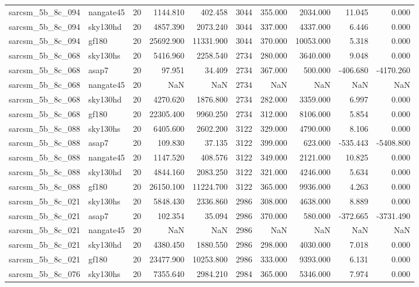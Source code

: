 \documentclass{article}
\begin{document}
\begin{longtable}{llrrrrrrrr}
sarcsm\_5b\_8c\_094 & nangate45 & 20 & 1144.810 & 402.458 & 3044 & 355.000 & 2034.000 & 11.045 & 0.000 \\
sarcsm\_5b\_8c\_094 & sky130hd & 20 & 4857.390 & 2073.240 & 3044 & 337.000 & 4337.000 & 6.446 & 0.000 \\
sarcsm\_5b\_8c\_094 & gf180 & 20 & 25692.900 & 11331.900 & 3044 & 370.000 & 10053.000 & 5.318 & 0.000 \\
sarcsm\_5b\_8c\_068 & sky130hs & 20 & 5416.960 & 2258.540 & 2734 & 280.000 & 3640.000 & 9.048 & 0.000 \\
sarcsm\_5b\_8c\_068 & asap7 & 20 & 97.951 & 34.409 & 2734 & 367.000 & 500.000 & -406.680 & -4170.260 \\
sarcsm\_5b\_8c\_068 & nangate45 & 20 & NaN & NaN & 2734 & NaN & NaN & NaN & NaN \\
sarcsm\_5b\_8c\_068 & sky130hd & 20 & 4270.620 & 1876.800 & 2734 & 282.000 & 3359.000 & 6.997 & 0.000 \\
sarcsm\_5b\_8c\_068 & gf180 & 20 & 22305.400 & 9960.250 & 2734 & 312.000 & 8106.000 & 5.854 & 0.000 \\
sarcsm\_5b\_8c\_088 & sky130hs & 20 & 6405.600 & 2602.200 & 3122 & 329.000 & 4790.000 & 8.106 & 0.000 \\
sarcsm\_5b\_8c\_088 & asap7 & 20 & 109.830 & 37.135 & 3122 & 399.000 & 623.000 & -535.443 & -5408.800 \\
sarcsm\_5b\_8c\_088 & nangate45 & 20 & 1147.520 & 408.576 & 3122 & 349.000 & 2121.000 & 10.825 & 0.000 \\
sarcsm\_5b\_8c\_088 & sky130hd & 20 & 4844.160 & 2083.250 & 3122 & 321.000 & 4246.000 & 5.634 & 0.000 \\
sarcsm\_5b\_8c\_088 & gf180 & 20 & 26150.100 & 11224.700 & 3122 & 365.000 & 9936.000 & 4.263 & 0.000 \\
sarcsm\_5b\_8c\_021 & sky130hs & 20 & 5848.430 & 2336.860 & 2986 & 308.000 & 4638.000 & 8.889 & 0.000 \\
sarcsm\_5b\_8c\_021 & asap7 & 20 & 102.354 & 35.094 & 2986 & 370.000 & 580.000 & -372.665 & -3731.490 \\
sarcsm\_5b\_8c\_021 & nangate45 & 20 & NaN & NaN & 2986 & NaN & NaN & NaN & NaN \\
sarcsm\_5b\_8c\_021 & sky130hd & 20 & 4380.450 & 1880.550 & 2986 & 298.000 & 4030.000 & 7.018 & 0.000 \\
sarcsm\_5b\_8c\_021 & gf180 & 20 & 23477.900 & 10253.800 & 2986 & 333.000 & 9393.000 & 6.131 & 0.000 \\
sarcsm\_5b\_8c\_076 & sky130hs & 20 & 7355.640 & 2984.210 & 2984 & 365.000 & 5346.000 & 7.974 & 0.000 \\

\end{longtable}
\end{document}
